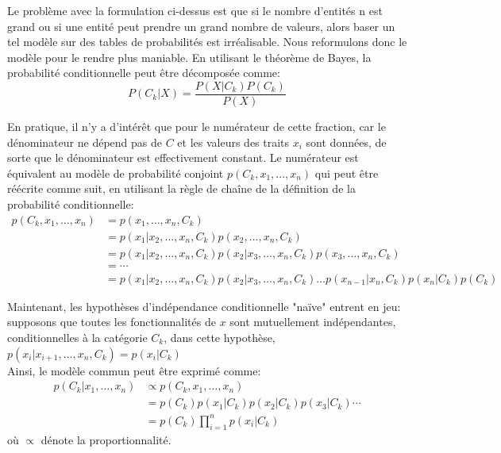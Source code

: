 Le problème avec la formulation ci-dessus est que si le nombre d'entités n est grand ou si une entité peut prendre un grand nombre de valeurs, alors baser un tel modèle sur des tables de probabilités est irréalisable. Nous reformulons donc le modèle pour le rendre plus maniable. En utilisant le théorème de Bayes, la probabilité conditionnelle peut être décomposée comme:
\begin{equation}
    P(C_{k} | X)=\frac{P(X | C_{k}) P(C_{k})}{P(X)}
\end{equation}

En pratique, il n'y a d'intérêt que pour le numérateur de cette fraction, car le dénominateur ne dépend pas de $C$ et les valeurs des traits $x_ {i}$ sont données, de sorte que le dénominateur est effectivement constant. Le numérateur est équivalent au modèle de probabilité conjoint ${p(C_{k},x_{1},...,x_{n})}$ qui peut être réécrite comme suit, en utilisant la règle de chaîne de la définition de la probabilité conditionnelle:
\begin{equation}
    \begin{aligned}
    p\left(C_{k}, x_{1}, \ldots, x_{n}\right) &=p\left(x_{1}, \ldots, x_{n}, C_{k}\right) \\
    &=p\left(x_{1} | x_{2}, \ldots, x_{n}, C_{k}\right) p\left(x_{2}, \ldots, x_{n}, C_{k}\right) \\
    &=p\left(x_{1} | x_{2}, \ldots, x_{n}, C_{k}\right) p\left(x_{2} | x_{3}, \ldots, x_{n}, C_{k}\right) p\left(x_{3}, \ldots, x_{n}, C_{k}\right) \\
    &=\cdots \\
    &=p\left(x_{1} | x_{2}, \ldots, x_{n}, C_{k}\right) p\left(x_{2} | x_{3}, \ldots, x_{n}, C_{k}\right) \ldots p\left(x_{n-1} | x_{n}, C_{k}\right) p\left(x_{n} | C_{k}\right) p\left(C_{k}\right)
    \end{aligned}
\end{equation}

Maintenant, les hypothèses d'indépendance conditionnelle "naïve" entrent en jeu: supposons que toutes les fonctionnalités de $x$ sont mutuellement indépendantes, conditionnelles à la catégorie $C_{k}$, dans cette hypothèse, $
    p\left(x_{i} | x_{i+1}, \ldots, x_{n}, C_{k}\right)=p\left(x_{i} | C_{k}\right)
    $ \\

Ainsi, le modèle commun peut être exprimé comme: 
\begin{equation}
    \begin{aligned}
    p\left(C_{k} | x_{1}, \ldots, x_{n}\right) & \propto p\left(C_{k}, x_{1}, \ldots, x_{n}\right) \\
    &=p\left(C_{k}\right) p\left(x_{1} | C_{k}\right) p\left(x_{2} | C_{k}\right) p\left(x_{3} | C_{k}\right) \cdots \\
    &=p\left(C_{k}\right) \prod_{i=1}^{n} p\left(x_{i} | C_{k}\right)
    \end{aligned}
\end{equation}
où $\propto$ dénote la proportionnalité. \\

